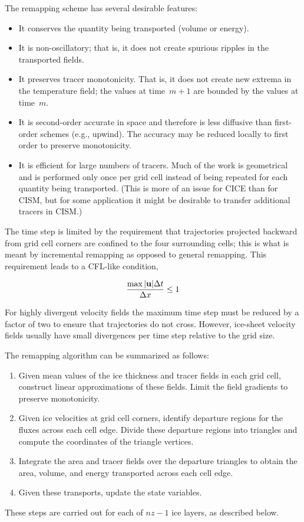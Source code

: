 The remapping scheme has several desirable features:
\begin{itemize}
\item It conserves the quantity being transported (volume or energy).
\item It is non-oscillatory; that is, it does not create spurious
      ripples in the transported fields.
\item It preserves tracer monotonicity.  That is, it does not create
      new extrema in the temperature field; the values
      at time~$m+1$ are bounded by the values at time~$m$.
\item It is second-order accurate in space and therefore is
      less diffusive than first-order schemes (e.g., upwind).
      The accuracy may be reduced locally to first order to preserve monotonicity.
\item It is efficient for large numbers of tracers.
      Much of the work is geometrical and is performed
      only once per grid cell instead of being repeated for each
      quantity being transported.  (This is more of an issue for CICE than
      for CISM, but for some application it might be desirable to transfer 
      additional tracers in CISM.)
\end{itemize}
The time step is limited by the requirement that trajectories
projected backward from grid cell corners are confined to the four
surrounding cells; this is what is meant by incremental
remapping as opposed to general remapping. This requirement leads to a 
CFL-like condition, 

\begin{equation}
\label{eq:CFL}
  \frac{\max|{\bf u}|\Delta t} {\Delta x} \leq 1 
\end{equation}

For highly divergent velocity fields the maximum time
step must be reduced by a factor of two to ensure that
trajectories do not cross.  However, ice-sheet velocity fields
usually have small divergences per time step relative to the grid size.

The remapping algorithm can be summarized as follows:
\begin{enumerate}
\item Given mean values of the ice thickness and tracer fields in each
      grid cell, construct linear approximations of these fields.
      Limit the field gradients to preserve monotonicity.
\item Given ice velocities at grid cell corners, identify departure
      regions for the fluxes across each cell edge.  Divide these
      departure regions into triangles and compute the coordinates
      of the triangle vertices.
\item Integrate the area and tracer fields over the departure triangles to obtain
      the area, volume, and energy transported across each cell edge.
\item Given these transports, update the state variables.
\end{enumerate}
These steps are carried out for each of $nz-1$ ice layers, as described below.

